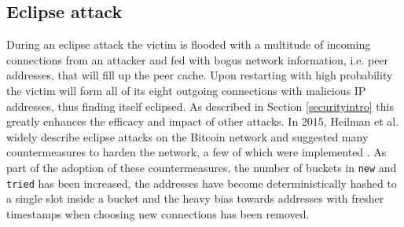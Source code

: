 \documentclass[12pt, letterpaper, twoside]{article}
\begin{document}
\subsection{Eclipse attack}\label{eclipse}
During an eclipse attack the victim is flooded with a multitude of incoming connections from an attacker and fed with bogus network information, i.e. peer addresses, that will fill up the peer cache. Upon restarting with high probability the victim will form all of its eight outgoing connections with malicious IP addresses, thus finding itself eclipsed. As described in Section \ref{securityintro} this greatly enhances the efficacy and impact of other attacks. In 2015, Heilman et al. widely describe eclipse attacks on the Bitcoin network and suggested many countermeasures to harden the network, a few of which were implemented \cite{eclipseatk}. As part of the adoption of these countermeasures, the number of buckets in \texttt{new} and \texttt{tried} has been increased, the addresses have become deterministically hashed to a single slot inside a bucket and the heavy bias towards addresses with fresher timestamps when choosing new connections has been removed.
\end{document}
